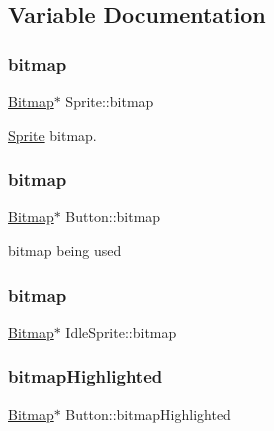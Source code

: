 \subsection{Variable Documentation}
\mbox{\label{group__sprite_ga626b702203ed42c3cd2af8f159eced42}} 
\subsubsection{\texorpdfstring{bitmap}{bitmap}\hspace{0.1cm}{\footnotesize\ttfamily [1/3]}}
{\footnotesize\ttfamily \mbox{\hyperlink{struct_bitmap}{Bitmap}}$\ast$ Sprite\+::bitmap}



\mbox{\hyperlink{struct_sprite}{Sprite}} bitmap. 

\mbox{\label{group__sprite_gaa57f73b6227397e025dc60e8c460fcb3}} 
\subsubsection{\texorpdfstring{bitmap}{bitmap}\hspace{0.1cm}{\footnotesize\ttfamily [2/3]}}
{\footnotesize\ttfamily \mbox{\hyperlink{struct_bitmap}{Bitmap}}$\ast$ Button\+::bitmap}



bitmap being used 

\mbox{\label{group__sprite_ga43ec29869061c84e407f6351ce4e8efe}} 
\subsubsection{\texorpdfstring{bitmap}{bitmap}\hspace{0.1cm}{\footnotesize\ttfamily [3/3]}}
{\footnotesize\ttfamily \mbox{\hyperlink{struct_bitmap}{Bitmap}}$\ast$ Idle\+Sprite\+::bitmap}

\mbox{\label{group__sprite_gaf915bef19af626f44f41a7513feaef7e}} 
\subsubsection{\texorpdfstring{bitmap\+Highlighted}{bitmapHighlighted}}
{\footnotesize\ttfamily \mbox{\hyperlink{struct_bitmap}{Bitmap}}$\ast$ Button\+::bitmap\+Highlighted}



